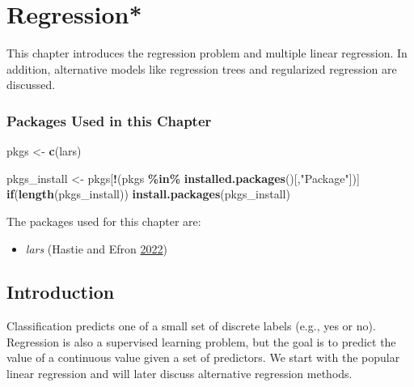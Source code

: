 \documentclass[
  notitlepage]{book}
\newenvironment{Shaded}{\begin{snugshade}}{\end{snugshade}}
\newcommand{\ControlFlowTok}[1]{\textcolor[rgb]{0.13,0.29,0.53}{\textbf{#1}}}
\newcommand{\KeywordTok}[1]{\textcolor[rgb]{0.13,0.29,0.53}{\textbf{#1}}}
\newcommand{\NormalTok}[1]{#1}
\newcommand{\OperatorTok}[1]{\textcolor[rgb]{0.81,0.36,0.00}{\textbf{#1}}}
\newcommand{\StringTok}[1]{\textcolor[rgb]{0.31,0.60,0.02}{#1}}
\providecommand{\tightlist}{%
  \setlength{\itemsep}{0pt}\setlength{\parskip}{0pt}}
\begin{document}
\hypertarget{regression}{%
\chapter{Regression*}\label{regression}}

This chapter introduces the regression problem
and multiple linear regression. In addition,
alternative models like regression trees and regularized regression
are discussed.

\hypertarget{packages-used-in-this-chapter-6}{%
\subsection*{Packages Used in this Chapter}\label{packages-used-in-this-chapter-6}}

\begin{Shaded}
\begin{Highlighting}[]
\NormalTok{pkgs \textless{}{-}}\StringTok{ }\KeywordTok{c}\NormalTok{(}\StringTok{\textquotesingle{}lars\textquotesingle{}}\NormalTok{)}
  
\NormalTok{pkgs\_install \textless{}{-}}\StringTok{ }\NormalTok{pkgs[}\OperatorTok{!}\NormalTok{(pkgs }\OperatorTok{\%in\%}\StringTok{ }\KeywordTok{installed.packages}\NormalTok{()[,}\StringTok{"Package"}\NormalTok{])]}
\ControlFlowTok{if}\NormalTok{(}\KeywordTok{length}\NormalTok{(pkgs\_install)) }\KeywordTok{install.packages}\NormalTok{(pkgs\_install)}
\end{Highlighting}
\end{Shaded}

The packages used for this chapter are:

\begin{itemize}
\tightlist
\item
  \emph{lars} (Hastie and Efron \protect\hyperlink{ref-R-lars}{2022})
\end{itemize}

\hypertarget{introduction-1}{%
\section{Introduction}\label{introduction-1}}

Classification predicts one of a small set of discrete labels (e.g., yes or no).
Regression is also a supervised learning problem, but the goal is to
predict the value of a continuous value given a set of predictors.
We start with the popular linear regression and will later discuss alternative
regression methods.
\end{document}
